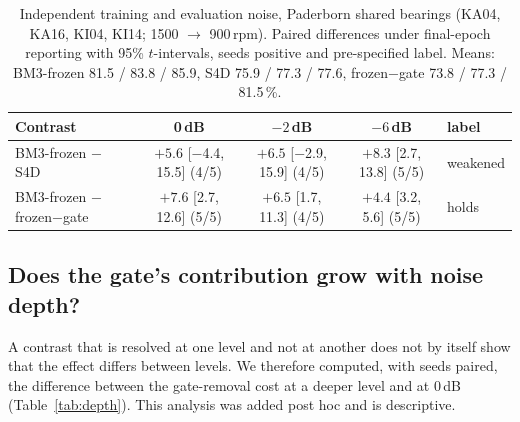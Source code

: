 \begin{table}[htbp]
\centering
\caption{Independent training and evaluation noise, Paderborn shared bearings (KA04, KA16, KI04, KI14; 1500 $\rightarrow$ 900\,rpm). Paired differences under final-epoch reporting with 95\% $t$-intervals, seeds positive and pre-specified label. Means: BM3-frozen 81.5 / 83.8 / 85.9, S4D 75.9 / 77.3 / 77.6, frozen$-$gate 73.8 / 77.3 / 81.5\,\%.}
\label{tab:indep_pu}
\scriptsize\setlength{\tabcolsep}{3pt}
\begin{tabular}{@{}lcccl@{}}
\toprule
Contrast & 0\,dB & $-2$\,dB & $-6$\,dB & label \\
\midrule
\shortstack[l]{BM3-frozen\\ $-$ S4D} & \shortstack{$+5.6$\\ {[}$-$4.4, 15.5{]} (4/5)} & \shortstack{$+6.5$\\ {[}$-$2.9, 15.9{]} (4/5)} & \shortstack{$+8.3$\\ {[}2.7, 13.8{]} (5/5)} & weakened \\[3pt]
\shortstack[l]{BM3-frozen\\ $-$ frozen$-$gate} & \shortstack{$+7.6$\\ {[}2.7, 12.6{]} (5/5)} & \shortstack{$+6.5$\\ {[}1.7, 11.3{]} (4/5)} & \shortstack{$+4.4$\\ {[}3.2, 5.6{]} (5/5)} & holds \\[3pt]
\bottomrule
\end{tabular}
\end{table}

\subsection{Does the gate's contribution grow with noise depth?}
\label{sec:results:depth}

A contrast that is resolved at one level and not at another does not by itself show that the effect differs between levels. We therefore computed, with seeds paired, the difference between the gate-removal cost at a deeper level and at $0$\,dB (Table~\ref{tab:depth}). This analysis was added post hoc and is descriptive.

